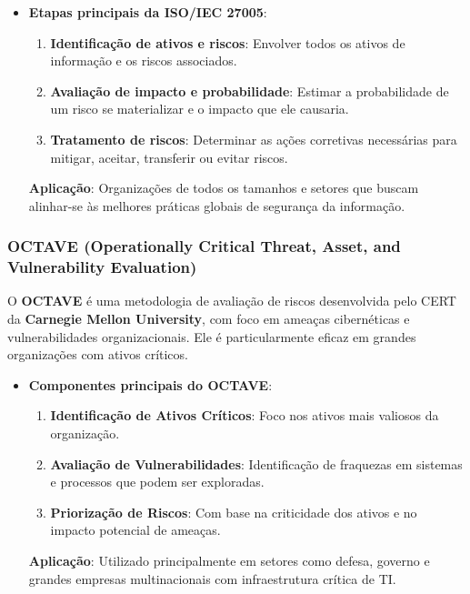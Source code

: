 \documentclass[12pt,oneside,a4paper,article]{abntex2}
\begin{document}
\begin{itemize}
    \item \textbf{Etapas principais da ISO/IEC 27005}:
    \begin{enumerate}
        \item \textbf{Identificação de ativos e riscos}: Envolver todos os ativos de informação e os riscos associados.
        \item \textbf{Avaliação de impacto e probabilidade}: Estimar a probabilidade de um risco se materializar e o impacto que ele causaria.
        \item \textbf{Tratamento de riscos}: Determinar as ações corretivas necessárias para mitigar, aceitar, transferir ou evitar riscos.
    \end{enumerate}
    \textbf{Aplicação}: Organizações de todos os tamanhos e setores que buscam alinhar-se às melhores práticas globais de segurança da informação.
\end{itemize}

\subsubsection{OCTAVE (Operationally Critical Threat, Asset, and Vulnerability Evaluation)}

O \textbf{OCTAVE} é uma metodologia de avaliação de riscos desenvolvida pelo CERT da \textbf{Carnegie Mellon University}, com foco em ameaças cibernéticas e vulnerabilidades organizacionais. Ele é particularmente eficaz em grandes organizações com ativos críticos.

\begin{itemize}
    \item \textbf{Componentes principais do OCTAVE}:
    \begin{enumerate}
        \item \textbf{Identificação de Ativos Críticos}: Foco nos ativos mais valiosos da organização.
        \item \textbf{Avaliação de Vulnerabilidades}: Identificação de fraquezas em sistemas e processos que podem ser exploradas.
        \item \textbf{Priorização de Riscos}: Com base na criticidade dos ativos e no impacto potencial de ameaças.
    \end{enumerate}
    \textbf{Aplicação}: Utilizado principalmente em setores como defesa, governo e grandes empresas multinacionais com infraestrutura crítica de TI.
\end{itemize}
\end{document}
